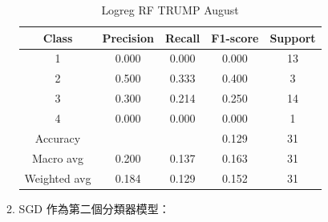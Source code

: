 \begin{enumerate}
\begin{enumerate}
\begin{table}[H]
                \vspace{1em}
                
                \scriptsize
                \begin{tabular}{c|cccc}
                \hline
                Class & Precision & Recall & F1-score & Support \\
                \hline
                1 & 0.000 & 0.000 & 0.000 & 13 \\
                2 & 0.500 & 0.333 & 0.400 & 3 \\
                3 & 0.300 & 0.214 & 0.250 & 14 \\
                4 & 0.000 & 0.000 & 0.000 & 1 \\
                \hline
                Accuracy &       &      & 0.129 & 31 \\
                Macro avg & 0.200 & 0.137 & 0.163 & 31 \\
                Weighted avg & 0.184 & 0.129 & 0.152 & 31 \\
                \hline
                \end{tabular}
                \caption{Logreg RF TRUMP August}
                \label{tab:classifier_2_report_logreg_rf_trump_non_filtered_aug}
                \end{table}



                \pagebreak
    
                \item SGD 作為第二個分類器模型：


\end{enumerate}
\end{enumerate}
